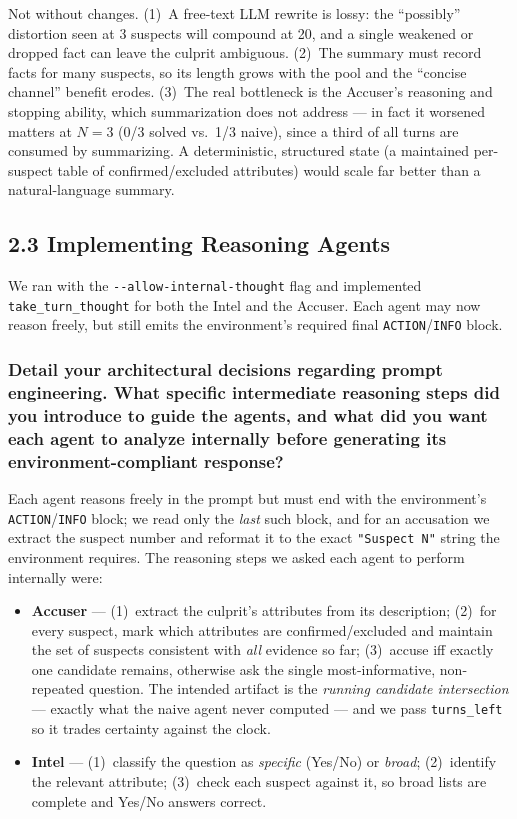 \documentclass{article}
\begin{document}
Not without changes. (1)~A free-text LLM rewrite is lossy: the ``possibly'' distortion seen
at 3 suspects will compound at 20, and a single weakened or dropped fact can leave the
culprit ambiguous. (2)~The summary must record facts for many suspects, so its length grows
with the pool and the ``concise channel'' benefit erodes. (3)~The real bottleneck is the
Accuser's reasoning and stopping ability, which summarization does not address --- in fact it
worsened matters at $N{=}3$ (0/3 solved vs.\ 1/3 naive), since a third of all turns are
consumed by summarizing. A deterministic, structured state (a
maintained per-suspect table of confirmed/excluded attributes) would scale far better than a
natural-language summary.

\subsection*{2.3 \quad Implementing Reasoning Agents}

We ran with the \texttt{-{}-allow-\allowbreak internal-\allowbreak thought} flag and
implemented \texttt{take\_turn\_thought} for both the Intel and the Accuser. Each agent may
now reason freely, but still emits the environment's required final
\texttt{ACTION}/\texttt{INFO} block.

\subsubsection*{Detail your architectural decisions regarding prompt engineering. What specific
intermediate reasoning steps did you introduce to guide the agents, and what did you want
each agent to analyze internally before generating its environment-compliant response?}

Each agent reasons freely in the prompt but must end with the environment's
\texttt{ACTION}/\texttt{INFO} block; we read only the \emph{last} such block, and for an
accusation we extract the suspect number and reformat it to the exact \texttt{"Suspect N"}
string the environment requires.
The reasoning steps we asked each agent to perform internally were:
\begin{itemize}[leftmargin=1.4em,itemsep=2pt]
  \item \textbf{Accuser} --- (1)~extract the culprit's attributes from its description;
  (2)~for every suspect, mark which attributes are confirmed/excluded and maintain the set of
  suspects consistent with \emph{all} evidence so far; (3)~accuse iff exactly one candidate
  remains, otherwise ask the single most-informative, non-repeated question. The intended
  artifact is the \emph{running candidate intersection} --- exactly what the naive agent
  never computed --- and we pass \texttt{turns\_left} so it trades certainty against the clock.
  \item \textbf{Intel} --- (1)~classify the question as \emph{specific} (Yes/No) or
  \emph{broad}; (2)~identify the relevant attribute; (3)~check each suspect against it, so
  broad lists are complete and Yes/No answers correct.
\end{itemize}
\end{document}
